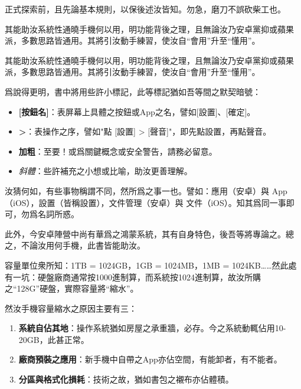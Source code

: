 
正式探索前，且先論基本規則，以保後述汝皆知。勿急，磨刀不誤砍柴工也。


其能助汝系統性通曉手機何以用，明功能背後之理，且無論汝乃安卓黨抑或蘋果派，多數思路皆通用。其將引汝動手練習，使汝自“會用”升至“懂用”。

其能助汝系統性通曉手機何以用，明功能背後之理，且無論汝乃安卓黨抑或蘋果派，多數思路皆通用。其將引汝動手練習，使汝自“會用”升至“懂用”。


爲說得更明，書中將用些許小標記，此等標記猶如吾等間之默契暗號：

\begin{itemize}
  \item \textbf{[按鈕名]}：表屏幕上具體之按鈕或App之名，譬如[設置]、[確定]。
  \item \textbf{>}：表操作之序，譬如"點 [設置] > [聲音]"，即先點設置，再點聲音。
  \item \textbf{加粗}：至要！或爲關鍵概念或安全警告，請務必留意。
  \item \emph{斜體}：些許補充之小想或比喻，助汝更善理解。
\end{itemize}


汝猜何如，有些事物稱謂不同，然所爲之事一也。譬如：應用（安卓）與 App（iOS），設置（皆稱設置），文件管理（安卓）與 文件（iOS）。知其爲同一事即可，勿爲名詞所惑。

此外，今安卓陣營中尚有華爲之鴻蒙系統，其有自身特色，後吾等將專論之。總之，不論汝用何手機，此書皆能助汝。


容量單位衆所知：1TB = 1024GB，1GB = 1024MB，1MB = 1024KB……然此處有一坑：硬盤廠商通常按1000進制算，而系統按1024進制算，故汝所購之“128G”硬盤，實際容量將“縮水”。

然汝手機容量縮水之原因主要有三：

\begin{enumerate}
  \item \textbf{系統自佔其地}：操作系統猶如房屋之承重牆，必存。今之系統動輒佔用10-20GB，此甚正常。
  \item \textbf{廠商預裝之應用}：新手機中自帶之App亦佔空間，有能卸者，有不能者。
  \item \textbf{分區與格式化損耗}：技術之故，猶如書包之襯布亦佔體積。
\end{enumerate}

